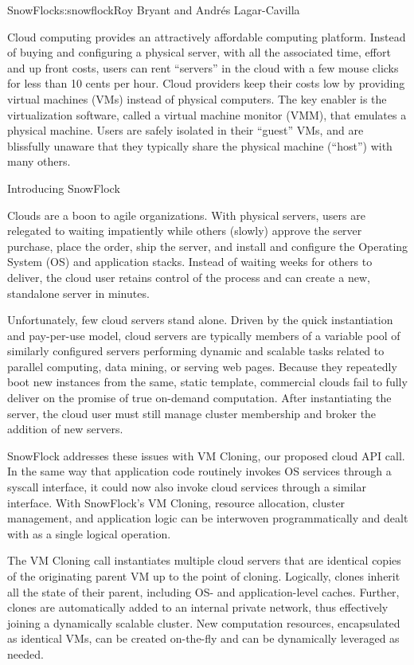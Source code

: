 \begin{aosachapter}{SnowFlock}{s:snowflock}{Roy Bryant and Andr\'e{s} Lagar-Cavilla}

Cloud computing provides an attractively affordable computing
platform.  Instead of buying and configuring a physical server, with
all the associated time, effort and up front costs, users can rent
``servers'' in the cloud with a few mouse clicks for
less than 10 cents per hour. Cloud providers keep their costs low by
providing virtual machines (VMs) instead of physical computers. The
key enabler is the virtualization software, called a virtual machine
monitor (VMM), that emulates a physical machine. Users are safely
isolated in their ``guest'' VMs, and are blissfully unaware that they
typically share the physical machine (``host'') with many others.

\begin{aosasect1}{Introducing SnowFlock}

Clouds are a boon to agile organizations. With physical servers, users
are relegated to waiting impatiently while others (slowly) approve the
server purchase, place the order, ship the server, and install and
configure the Operating System (OS) and application stacks. Instead of
waiting weeks for others to deliver, the cloud user retains control of
the process and can create a new, standalone server in minutes.

Unfortunately, few cloud servers stand alone.  Driven by the quick
instantiation and pay-per-use model, cloud servers are typically
members of a variable pool of similarly configured servers performing
dynamic and scalable tasks related to parallel computing, data mining,
or serving web pages.  Because they repeatedly boot new instances from
the same, static template, commercial clouds fail to fully deliver on
the promise of true on-demand computation. After instantiating the
server, the cloud user must still manage cluster membership and broker
the addition of new servers.

SnowFlock addresses these issues with VM Cloning, our proposed cloud
API call. In the same way that application code routinely invokes OS
services through a syscall interface, it could now also invoke cloud
services through a similar interface. With SnowFlock's VM Cloning,
resource allocation, cluster management, and application logic can be
interwoven programmatically and dealt with as a single logical
operation.

The VM Cloning call instantiates multiple cloud servers that are
identical copies of the originating parent VM up to the point of
cloning. Logically, clones inherit all the state of their parent,
including OS- and application-level caches. Further, clones are
automatically added to an internal private network, thus effectively
joining a dynamically scalable cluster. New computation resources,
encapsulated as identical VMs, can be created on-the-fly and can be
dynamically leveraged as needed.


\end{aosasect1}
\end{aosachapter}
